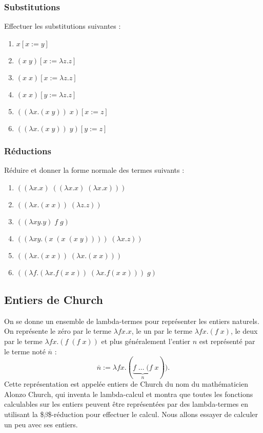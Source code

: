\documentclass[11pt, a4paper]{article}
\begin{document}
\subsubsection{Substitutions}
\label{sec:org6050be9}
Effectuer les substitutions suivantes :
\begin{multicols}{3}
\begin{enumerate}
\item \(x[x:=y]\)
\item \((x\; y)[x:=\lambda z. z]\)
\item \((x\; x)[x:=\lambda z. z]\)
\item \((x\; x)[y:=\lambda z. z]\)
\item \(((\lambda x. (x\; y))\; x)[x:=z]\)
\item \(((\lambda x. (x\; y))\; y)[y:=z]\)
\end{enumerate}
\end{multicols}

\subsubsection{Réductions}
\label{sec:orgbb8a400}
Réduire et donner la forme normale des termes suivants :
\begin{multicols}{2}
\begin{enumerate}
\item \(((\lambda x. x)\;((\lambda x. x)\;(\lambda x. x)))\)
\item \(((\lambda x. (x\; x))\;(\lambda z. z))\)
\item \(((\lambda xy. y)\; f\; g)\)
\item \(((\lambda xy. (x\; (x\; (x\; y))))\; (\lambda x.z))\)
\item \(((\lambda x. (x\; x))\;(\lambda x. (x\; x)))\)
\item \(((\lambda f.(\lambda x.f (x\; x))\; (\lambda x.f (x\; x)))\; g)\)
\end{enumerate}
\end{multicols}
\subsection{Entiers de Church}
\label{sec:orga775498}
On se donne un ensemble de lambda-termes pour représenter les entiers
naturels. On représente le zéro par le terme \(\lambda fx. x\), le un
par le terme \(\lambda fx. (f\; x)\), le deux par le terme \(\lambda fx.
 (f\; (f\; x))\) et plus généralement l'entier \(n\) est représenté par
le terme noté \(\overline{n}\) : \[ \overline{n} := \lambda fx.
 (\underbrace{f\;\ldots\; (f}_{n}\; x)). \] Cette représentation est
appelée entiers de Church du nom du mathématicien Alonzo Church, qui
inventa le lambda-calcul et montra que toutes les fonctions
calculables sur les entiers peuvent être représentées par des
lambda-termes en utilisant la \$\(\beta\)\$-réduction pour effectuer le
calcul. Nous allons essayer de calculer un peu avec ses entiers.
\end{document}
